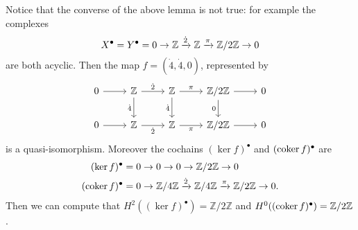 \begin{rem}[]
	Notice that the converse of the above lemma is not true:
	for example the complexes
	\begin{equation}
	X^\bullet = Y^\bullet = 0 \to \mathbb{Z} \xrightarrow{\dot{2}} 
	\mathbb{Z} \xrightarrow{\pi} \mathbb{Z}/2\mathbb{Z} \to 0
	\end{equation} 
	are both acyclic.
	Then the map $f = (\dot{4}, \dot{4}, 0)$, represented by
	\begin{equation}
	\begin{tikzcd}
		0 \arrow[r, "", rightarrow] &
		\Z \arrow[r, "\dot{2}", rightarrow] \arrow[d, "\dot{4}"', rightarrow] &
		\Z \arrow[r, "\pi", rightarrow] \arrow[d, "\dot{4}"', rightarrow] &
		\mathbb{Z}/2\mathbb{Z} \arrow[r, "", rightarrow] \arrow[d, "0"', rightarrow] &
		0 \\
		0 \arrow[r, "", rightarrow] &
		\Z \arrow[r, "\dot{2}"', rightarrow] &
		\Z \arrow[r, "\pi"', rightarrow] &
		\mathbb{Z}/2\mathbb{Z} \arrow[r, "", rightarrow] &
		0 
	\end{tikzcd}
	\end{equation} 
	is a quasi-isomorphism.
	Moreover the cochains $(\ker f)^\bullet$ and $(\operatorname{coker} f)^\bullet$ are
	\begin{align}
		(\ker f)^\bullet &= 0 \to 0 \to 0 \to \mathbb{Z}/2\mathbb{Z} \to 0\\
		(\operatorname{coker} f)^\bullet &= 0 \to \mathbb{Z}/4\mathbb{Z} \xrightarrow{\dot{2}} \mathbb{Z}/4\mathbb{Z}
		\xrightarrow{\pi} \mathbb{Z}/2\mathbb{Z} \to 0
	.\end{align} 
	Then we can compute that $H^2((\ker f)^\bullet) = \mathbb{Z}/2\mathbb{Z}$
	and $H^0((\operatorname{coker} f)^\bullet) = \mathbb{Z}/2\mathbb{Z}$.
\end{rem}
